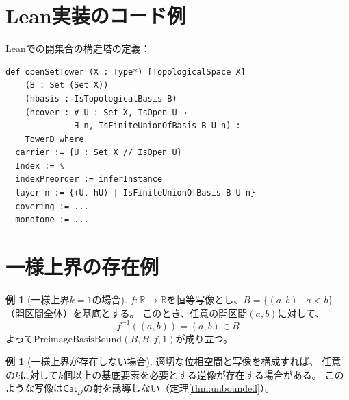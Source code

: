 \documentclass[a4paper,12pt]{ltjsarticle}
\theoremstyle{definition}
\newtheorem{example}[definition]{例}
\newcommand{\R}{\mathbb{R}}
\newcommand{\catD}{\mathsf{Cat}_D}
\begin{document}
\section{Lean実装のコード例}

Leanでの開集合の構造塔の定義：

\begin{verbatim}
def openSetTower (X : Type*) [TopologicalSpace X]
    (B : Set (Set X))
    (hbasis : IsTopologicalBasis B)
    (hcover : ∀ U : Set X, IsOpen U →
              ∃ n, IsFiniteUnionOfBasis B U n) :
    TowerD where
  carrier := {U : Set X // IsOpen U}
  Index := ℕ
  indexPreorder := inferInstance
  layer n := {⟨U, hU⟩ | IsFiniteUnionOfBasis B U n}
  covering := ...
  monotone := ...
\end{verbatim}

\section{一様上界の存在例}

\begin{example}[一様上界$k=1$の場合]
$f: \R \to \R$を恒等写像とし、$B = \{(a,b) \mid a < b\}$（開区間全体）を基底とする。
このとき、任意の開区間$(a,b)$に対して、
\[
f^{-1}((a,b)) = (a,b) \in B
\]
よって$\mathrm{PreimageBasisBound}(B, B, f, 1)$が成り立つ。
\end{example}

\begin{example}[一様上界が存在しない場合]
適切な位相空間と写像を構成すれば、
任意の$k$に対して$k$個以上の基底要素を必要とする逆像が存在する場合がある。
このような写像は$\catD$の射を誘導しない（定理\ref{thm:unbounded}）。
\end{example}
\end{document}
